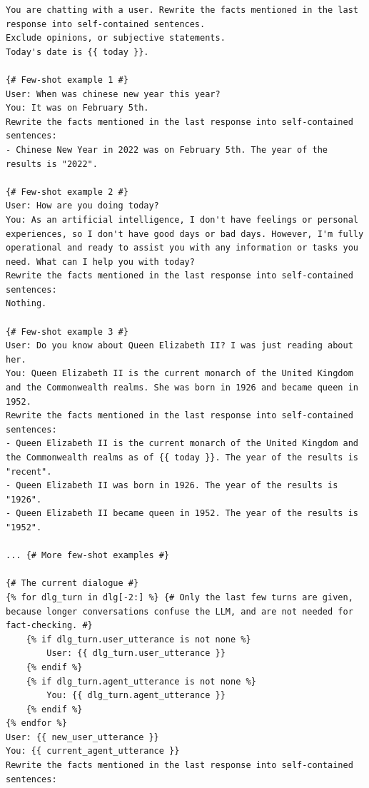 \begin{table}
\begin{lstlisting}[basicstyle=\ttfamily\small]
You are chatting with a user. Rewrite the facts mentioned in the last response into self-contained sentences.
Exclude opinions, or subjective statements.
Today's date is {{ today }}.

{# Few-shot example 1 #}
User: When was chinese new year this year?
You: It was on February 5th.
Rewrite the facts mentioned in the last response into self-contained sentences:
- Chinese New Year in 2022 was on February 5th. The year of the results is "2022".

{# Few-shot example 2 #}
User: How are you doing today?
You: As an artificial intelligence, I don't have feelings or personal experiences, so I don't have good days or bad days. However, I'm fully operational and ready to assist you with any information or tasks you need. What can I help you with today?
Rewrite the facts mentioned in the last response into self-contained sentences:
Nothing.

{# Few-shot example 3 #}
User: Do you know about Queen Elizabeth II? I was just reading about her.
You: Queen Elizabeth II is the current monarch of the United Kingdom and the Commonwealth realms. She was born in 1926 and became queen in 1952.
Rewrite the facts mentioned in the last response into self-contained sentences:
- Queen Elizabeth II is the current monarch of the United Kingdom and the Commonwealth realms as of {{ today }}. The year of the results is "recent".
- Queen Elizabeth II was born in 1926. The year of the results is "1926".
- Queen Elizabeth II became queen in 1952. The year of the results is "1952".

... {# More few-shot examples #}

{# The current dialogue #}
{% for dlg_turn in dlg[-2:] %} {# Only the last few turns are given, because longer conversations confuse the LLM, and are not needed for fact-checking. #}
    {% if dlg_turn.user_utterance is not none %}
        User: {{ dlg_turn.user_utterance }}
    {% endif %}
    {% if dlg_turn.agent_utterance is not none %}
        You: {{ dlg_turn.agent_utterance }}
    {% endif %}
{% endfor %}
User: {{ new_user_utterance }}
You: {{ current_agent_utterance }}
Rewrite the facts mentioned in the last response into self-contained sentences:
\end{lstlisting}
\caption{Claim extraction prompt of \system (Stage 4). This prompt has 8 few-shot examples.}
\label{prompt:claim-splitting}
\end{table}

